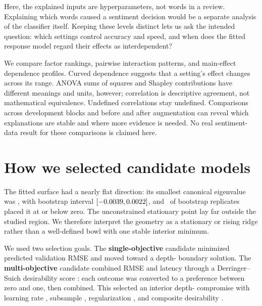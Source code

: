 \documentclass[12pt,a4paper]{article}
\newcommand{\term}[1]{\textbf{#1}}
\begin{document}
Here, the explained inputs are hyperparameters, not words in a review. Explaining which words caused a sentiment decision would be a separate analysis of the classifier itself. Keeping these levels distinct lets us ask the intended question: which settings control accuracy and speed, and when does the fitted response model regard their effects as interdependent?

We compare factor rankings, pairwise interaction patterns, and main-effect dependence profiles. Curved dependence suggests that a setting's effect changes across its range. ANOVA sums of squares and Shapley contributions have different meanings and units, however; correlation is descriptive agreement, not mathematical equivalence. Undefined correlations stay undefined. Comparisons across development blocks and before and after augmentation can reveal which explanations are stable and where more evidence is needed. No real sentiment-data result for these comparisons is claimed here.

\section{How we selected candidate models}
The fitted surface had a nearly flat direction: its smallest canonical eigenvalue was \numEigOne, with bootstrap interval $[-0.0039,0.0022]$, and \numFracMinEigLeZero\ of bootstrap replicates placed it at or below zero. The unconstrained stationary point lay far outside the studied region. We therefore interpret the geometry as a stationary or rising ridge rather than a well-defined bowl with one stable interior minimum.

We used two selection goals. The \term{single-objective} candidate minimized predicted validation RMSE and moved toward a depth-\numPubDepthSo{} boundary solution. The \term{multi-objective} candidate combined RMSE and latency through a Derringer--Suich desirability score \cite{derringer1980simultaneous}: each outcome was converted to a preference between zero and one, then combined. This selected an interior depth-\numPubDepthMo{} compromise with learning rate \numOptEta, subsample \numOptSubsample, regularization \numOptLambda, and composite desirability \numOptD.
\end{document}
